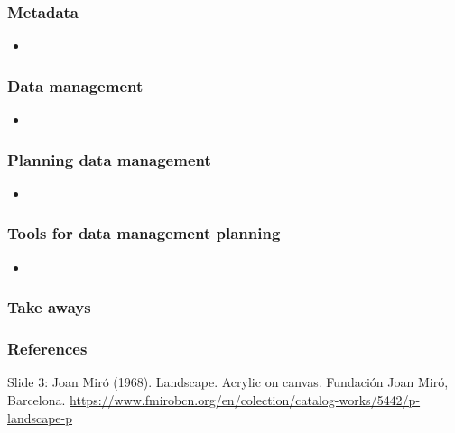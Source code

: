 \documentclass{beamer}
\begin{document}
\begin{frame}
  \frametitle{Metadata}
  
  \begin{itemize}
  \item 
  \end{itemize}
\end{frame}

\begin{frame}
  \frametitle{Data management}
  
  \begin{itemize}
  \item 
  \end{itemize}
\end{frame}

\begin{frame}
  \frametitle{Planning data management}
  
  \begin{itemize}
  \item 
  \end{itemize}
\end{frame}

\begin{frame}
  \frametitle{Tools for data management planning}
  
  \begin{itemize}
  \item 
  \end{itemize}
\end{frame}

\begin{frame}
  \frametitle{Take aways}
  
\end{frame}

\begin{frame}
  \frametitle{References}
  \tiny
   
  
  
  Slide 3: Joan Mir{\'o} (1968). Landscape. Acrylic on canvas. Fundaci{\'o}n Joan Mir{\'o}, Barcelona. \url{https://www.fmirobcn.org/en/colection/catalog-works/5442/p-landscape-p}
\end{frame}
\end{document}
